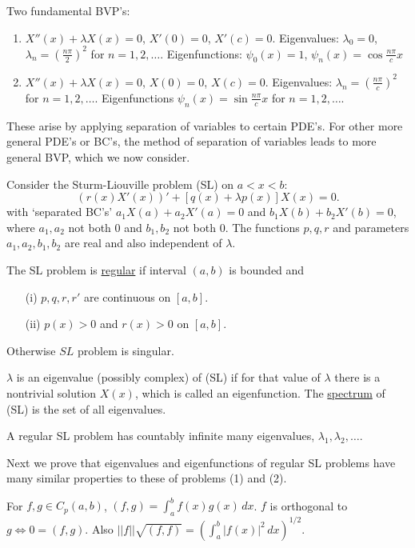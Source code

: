 \documentclass[]{article}
\begin{document}
\begin{recall}
	Two fundamental BVP's:
	\begin{enumerate}
		\item $X''(x) + \lambda X(x) = 0$, $X'(0) = 0$, $X'(c) = 0$.
		Eigenvalues: $\lambda_0 = 0$, $\lambda_n = \left( \frac{n\pi}{2} \right)^2$ for $n=1,2,\dots$.
		Eigenfunctions: $\psi_0(x) = 1$, $\psi_n(x) = \cos{\frac{n\pi}{c}x}$
		\item $X''(x) + \lambda X(x) = 0$, $X(0) = 0$, $X(c) = 0$. Eigenvalues: $\lambda_n = \left(\frac{n\pi}{c}\right)^2$ for $n=1,2,\dots$. Eigenfunctions $\psi_n(x) = \sin{\frac{n\pi}{c}x}$ for $n=1,2,\dots$.
	\end{enumerate}
	These arise by applying separation of variables to certain PDE's.
	For other more general PDE's or BC's, the method of separation of variables leads to more general BVP, which we now consider.
\end{recall}
Consider the Sturm-Liouville problem (SL) on $a<x<b$: $$\left( r(x)X'(x) \right)' + \left[ q(x) + \lambda p(x) \right] X(x) = 0.$$
with `separated BC's' $a_1 X(a) + a_2 X'(a) = 0$ and $b_1 X(b) + b_2 X'(b) = 0$, where $a_1,a_2$ not both 0 and $b_1,b_2$ not both 0. The functions $p,q,r$ and parameters $a_1,a_2,b_1,b_2$ are real and also independent of $\lambda$.
\begin{definition}
	The SL problem is \underline{regular} if interval $(a,b)$ is bounded and
	\begin{enumerate}
		\item[(i)] $p,q,r,r'$ are continuous on $[a,b]$.
		\item[(ii)] $p(x) >0$ and $r(x)>0$ on $[a,b]$.
	\end{enumerate}
	Otherwise $SL$ problem is singular.
\end{definition}
\begin{definition}
	$\lambda$ is an eigenvalue (possibly complex) of (SL) if for that value of $\lambda$ there is a nontrivial solution $X(x)$, which is called an eigenfunction.
	The \underline{spectrum} of (SL) is the set of all eigenvalues.
\end{definition}
\begin{fact}
	 A regular SL problem has countably infinite many eigenvalues, $\lambda_1,\lambda_2,\dots$.
\end{fact}
Next we prove that eigenvalues and eigenfunctions of regular SL problems have many similar properties to these of problems (1) and (2).
\begin{recall}
	For $f,g\in C_p(a,b)$, $(f,g) = \int_a^b f(x) g(x) \, dx$. $f$ is orthogonal to $g \iff 0 = (f,g)$. Also $||f||\sqrt{(f,f)} = \left( \int_a^b |f(x)|^2 \, dx \right)^{1/2}$.
\end{recall}
\end{document}
